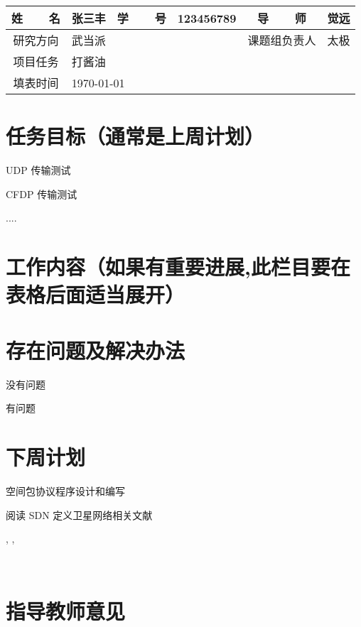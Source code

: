 \documentclass[a4paper,11pt]{article}
\let\oldenum\enumerate
\let\oldendenum\endenumerate
\renewenvironment{enumerate}
{\oldenum\setlength{\parskip}{\smallskipamount} \itemsep=-2pt}
{\oldendenum}
\begin{document}
\def\name{张三丰}
\def\studentid{123456789}
\def\mentor{觉远}
\def\leader{太极}
\def\direction{武当派}

\renewcommand{\arraystretch}{1.5}
\begin{center}
\begin{tabularx}{\textwidth}{c|c|c|c|c|X} 
    姓~~~~名 & \name & 学~~~~号 & \studentid & 导~~~~师  & \mentor \\\hline
    研究方向 & \multicolumn{3}{l|}{\direction} & 课题组负责人 &
        \leader \\\hline
    项目任务 & \multicolumn{5}{l}{打酱油} \\\hline
    填表时间 & \multicolumn{5}{l}{\today}\\\hline
\end{tabularx}
\end{center}

\section{任务目标（通常是上周计划）}
\begin{enumerate}
    \item UDP 传输测试
    \item CFDP 传输测试
    \item ....
\end{enumerate}

\section{工作内容（如果有重要进展,此栏目要在表格后面适当展开）}
\lipsum[2-3]

\section{存在问题及解决办法}
\lipsum[9]
\begin{enumerate}
    \item 没有问题
    \item 有问题
\end{enumerate}

\section{下周计划}
\begin{enumerate}
    \item 空间包协议程序设计和编写
    \item 阅读 SDN 定义卫星网络相关文献
\end{enumerate}

\lipsum[7]  

\begin{thebibliography}{9}
    ,
    ,
\end{thebibliography}

\vfill
~\section{指导教师意见}

\vskip 2cm
\end{document}
